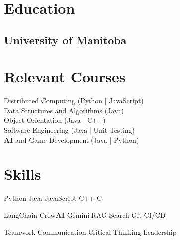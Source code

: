  

\begin{minipage}[t]{0.36\textwidth}
    \section{Education} %
      \subsection{University of Manitoba}
    \sectionsep

    \section{Relevant Courses} %
      Distributed Computing (Python | JavaScript)\\
      Data Structures and Algorithms (Java)\\
      Object Orientation (Java | C++)\\
      Software Engineering (Java | Unit Testing)\\
      \textbf{AI} and Game Development (Java | Python)\\
    \sectionsep

    \section{Skills} 
      Python \textbullet{} Java \textbullet{} JavaScript \textbullet{} C++ \textbullet{} C \\
    \skillsVSpace

      LangChain \textbullet{} Crew\textbf{AI} \textbullet{} Gemini \textbullet{} RAG Search \textbullet{} Git \textbullet{} CI/CD \\
    \skillsVSpace

      Teamwork \textbullet{} Communication \textbullet{} Critical Thinking \textbullet{} Leadership  \\
    \skillsVSpace
    \sectionsep
\end{minipage} \hfill \begin{minipage}[t]{0.63\textwidth}


\end{minipage}
